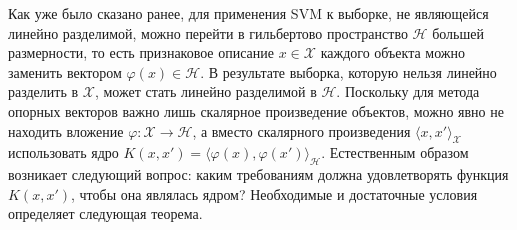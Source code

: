 Как уже было сказано ранее, для применения SVM к выборке, не являющейся линейно разделимой, можно перейти в гильбертово пространство $\mathcal{H}$ большей размерности, то есть признаковое описание $x \in \mathcal{X}$ каждого объекта можно заменить вектором $\varphi(x) \in \mathcal{H}$. В результате выборка, которую нельзя линейно разделить в $\mathcal{X}$, может стать линейно разделимой в $\mathcal{H}$. Поскольку для метода опорных векторов важно лишь скалярное произведение объектов, можно явно не находить вложение $\varphi \colon \mathcal{X} \to \mathcal{H}$, а вместо скалярного произведения $\langle x, x' \rangle_\mathcal{X}$ использовать ядро $K(x, x') = \langle \varphi(x), \varphi(x') \rangle_\mathcal{H}$. Естественным образом возникает следующий вопрос: каким требованиям должна удовлетворять функция $K(x, x')$, чтобы она являлась ядром? Необходимые и достаточные условия определяет следующая теорема.

